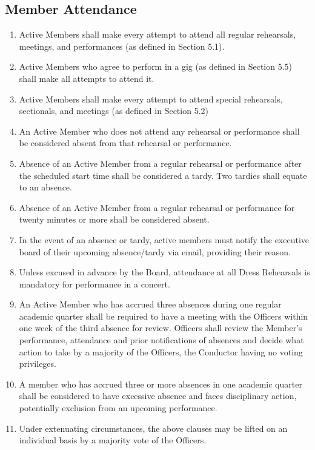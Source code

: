 \documentclass{article}
\begin{document}
\subsection{Member Attendance}
\begin{enumerate}
\item Active Members shall make every attempt to attend all regular rehearsals,
meetings, and performances (as defined in Section 5.1).
\item Active Members who agree to perform in a gig (as defined in Section
5.5) shall make all attempts to attend it.
\item Active Members shall make every attempt to attend special rehearsals,
sectionals, and meetings (as defined in Section 5.2)
\item An Active Member who does not attend any rehearsal or performance
shall be considered absent from that rehearsal or performance.
\item Absence of an Active Member from a regular rehearsal or performance
after the scheduled start time shall be considered a tardy. Two tardies
shall equate to an absence.
\item Absence of an Active Member from a regular rehearsal or performance
for twenty minutes or more shall be considered absent.
\item In the event of an absence or tardy, active members must notify the executive board of their upcoming absence/tardy via email, providing their reason.
\item Unless excused in advance by the Board, attendance at all Dress Rehearsals
is mandatory for performance in a concert.
\item An Active Member who has accrued three absences during one regular
academic quarter shall be required to have a meeting with the Officers
within one week of the third absence for review. Officers shall review
the Member's performance, attendance and prior notifications of absences and decide what action to
take by a majority of the Officers, the Conductor having no voting
privileges.
\item A member who has accrued three or more absences in one academic quarter
shall be considered to have excessive absence and faces disciplinary
action, potentially exclusion from an upcoming performance.
\item Under extenuating circumstances, the above clauses may be lifted on
an individual basis by a majority vote of the Officers.
\end{enumerate}
\end{document}
